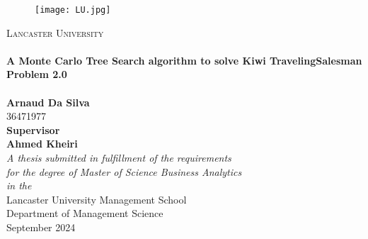\begin{titlepage}
\begin{center}

\begin{figure}[htbp]
\centering
\texttt{[image: LU.jpg]}
\end{figure}

\textsc{\LARGE Lancaster University}\\[0.7cm] 
\HRule \\[0.4cm]
{\huge \bfseries A Monte Carlo Tree Search algorithm to solve Kiwi TravelingSalesman Problem 2.0}\\[0.4cm]
\HRule \\[0.4cm]
{\LARGE \bfseries Arnaud Da Silva}\\[0.4cm]
{\LARGE  36471977}\\[1cm]
{\large  \bfseries Supervisor }\\[0.4cm]
{\large \bfseries Ahmed Kheiri}\\[1cm]
\large \textit{A thesis submitted in fulfillment of the requirements\\ for the degree of Master of Science Business Analytics}\\[0.3cm] %
\textit{in the}\\[0.4cm]
Lancaster University Management School \\
Department of Management Science\\[1cm] %
{\large September 2024}\\[4cm]
\vfill
\end{center}
\end{titlepage}
